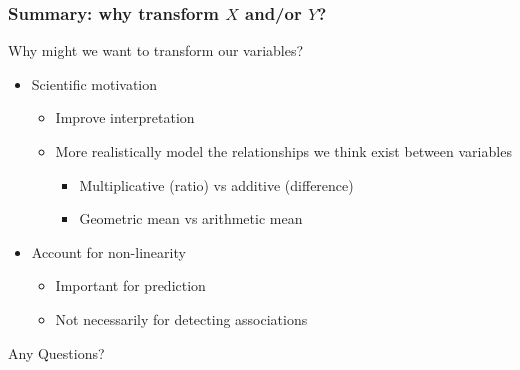 \documentclass[10pt,t]{beamer}
\begin{document}
\begin{frame}
\frametitle{Summary: why transform $X$ and/or $Y$?}
Why might we want to transform our variables? \vspace{0.3cm}
\begin{itemize}
	\item Scientific motivation
	\begin{itemize}
		\item Improve interpretation
		\item More realistically model the relationships we think exist between variables
		\begin{itemize}
			\item Multiplicative (ratio) vs additive (difference)
			\item Geometric mean vs arithmetic mean
		\end{itemize}
	\end{itemize}
	\item Account for non-linearity 
	\begin{itemize}
		\item Important for prediction
		\item Not necessarily for detecting associations
	\end{itemize}
\end{itemize}
\end{frame}

\begin{frame}[c]
\centering \huge Any Questions?
\end{frame}
\end{document}
